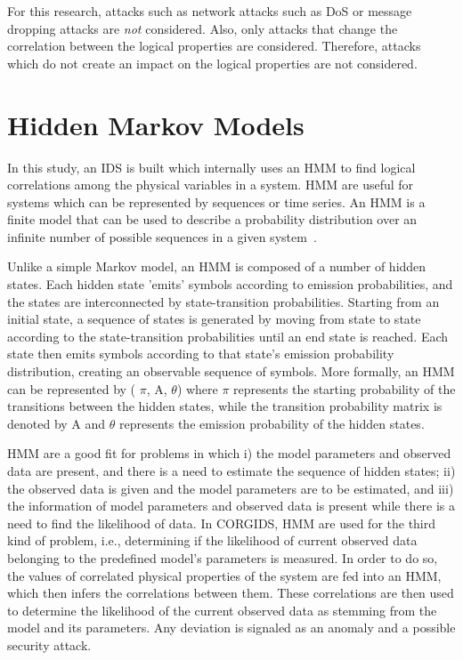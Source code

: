 For this research, attacks such as network attacks such as \ac{DoS} or message dropping attacks are \textit{not} considered. Also, only attacks that change the correlation between the logical properties are considered. Therefore, attacks which do not create an impact on the logical properties are not considered. 

\section{Hidden Markov Models}
\label{sec:HMM_explain}

In this study, an \ac{IDS} is built which internally uses an \ac{HMM} to find logical correlations among the physical variables in a system. \ac{HMM} are useful for systems which can be represented by sequences or time series. An \ac{HMM} is a finite model that can be used to describe a probability distribution over an infinite number of possible sequences in a given system~\cite{eddy1996hidden}.

Unlike a simple Markov model, an \ac{HMM} is composed of a number of hidden states. Each hidden state 'emits' symbols according to emission probabilities, and the states are interconnected by state-transition probabilities. Starting from an initial state, a sequence of states is generated by moving from state to state according to the state-transition probabilities until an end state is reached. Each state then emits symbols according to that state's emission probability distribution, creating an observable sequence of symbols.
More formally, an \ac{HMM} can be represented by ( $\pi$, A, $\theta$) where $\pi$ represents the starting probability of the transitions between the hidden states, while the transition probability matrix is denoted by A and $\theta$ represents the emission probability of the hidden states.

\ac{HMM} are a good fit for problems in which i) the model parameters and observed data are present, and there is a need to estimate the sequence of hidden states; ii) the observed data is given and the model parameters are to be estimated, and iii) the information of model parameters and observed data is present while there is a need to find the likelihood of data. In \ac{CORGIDS}, \ac{HMM} are used for the third kind of problem, i.e., determining if the likelihood of current observed data belonging to the predefined model's parameters is measured. In order to do so, the values of correlated physical properties of the system are fed into an \ac{HMM}, which then infers the correlations between them. These correlations are then used to determine the likelihood of the current observed data as stemming from the model and its parameters. Any deviation is signaled as an anomaly and a possible security attack.


